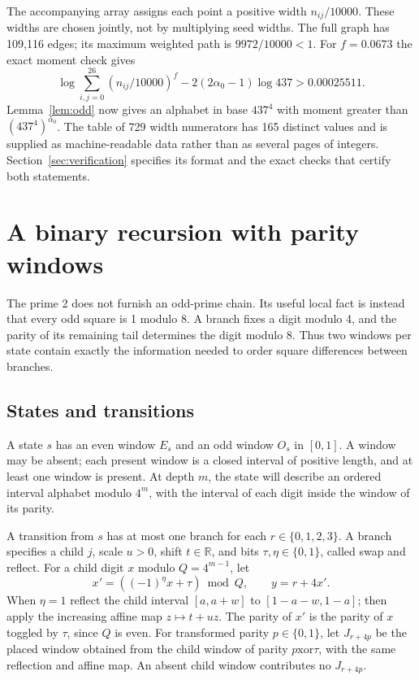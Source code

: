 \documentclass[11pt]{article}
\theoremstyle{definition}
\theoremstyle{remark}
\newcommand{\R}{\mathbb R}
\newcommand{\al}{\alpha_0}
\begin{document}
The accompanying array assigns each point a positive width $n_{ij}/10000$.
These widths are chosen jointly, not by multiplying seed widths.
The full graph has 109,116 edges; its maximum weighted path is
$9972/10000<1$. For $f=0.0673$ the exact moment check gives
\begin{equation}\label{eq:437moment}
 \log\sum_{i,j=0}^{26}(n_{ij}/10000)^f
       -2(2\al-1)\log437>0.00025511.
\end{equation}
Lemma~\ref{lem:odd} now gives an alphabet in base $437^4$ with moment
greater than $(437^4)^{\al}$. The table of 729 width numerators has
165 distinct values and is supplied as machine-readable data rather
than as several pages of integers. Section~\ref{sec:verification}
specifies its format and the exact checks that certify both statements.


\section{A binary recursion with parity windows}\label{sec:binary}
The prime 2 does not furnish an odd-prime chain. Its useful local fact is
instead that every odd square is 1 modulo 8. A branch fixes a digit modulo
4, and the parity of its remaining tail determines the digit modulo 8.
Thus two windows per state contain exactly the information needed to order
square differences between branches.

\subsection{States and transitions}
A state $s$ has an even window $E_s$ and an odd window $O_s$ in $[0,1]$.
A window may be absent; each present window is a closed interval of
positive length, and at least one window is present. At depth $m$, the
state will describe an ordered interval alphabet modulo $4^m$, with the
interval of each digit inside the window of its parity.

A transition from $s$ has at most one branch for each $r\in\{0,1,2,3\}$.
A branch specifies a child $j$, scale $u>0$, shift $t\in\R$, and bits
$\tau,\eta\in\{0,1\}$, called swap and reflect. For a child digit $x$
modulo $Q=4^{m-1}$, let
\begin{equation}\label{eq:binarydigit}
 x'=((-1)^\eta x+\tau)\bmod Q,\qquad y=r+4x'.
\end{equation}
When $\eta=1$ reflect the child interval $[a,a+w]$ to
$[1-a-w,1-a]$; then apply the increasing affine map $z\mapsto t+uz$.
The parity of $x'$ is the parity of $x$ toggled by $\tau$, since $Q$ is
even. For transformed parity $p\in\{0,1\}$, let $J_{r+4p}$ be the
placed window obtained from the child window of parity $p\mathbin{\mathrm{xor}}\tau$,
with the same reflection and affine map. An absent child window contributes
no $J_{r+4p}$.
\end{document}
